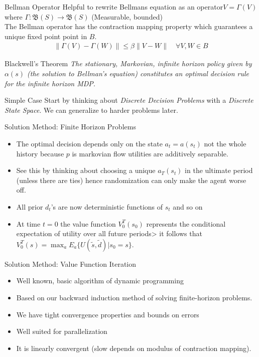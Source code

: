 \documentclass[xcolor=pdftex,dvipsnames,table,mathserif]{beamer}
\begin{document}
\begin{frame}{Bellman Operator}
Helpful to rewrite Bellmans equation as an operator$V = \Gamma(V)$ where $\Gamma: \mathfrak{B}(S) \rightarrow \mathfrak{B}(S)$ (Measurable, bounded) \\
\vspace{0.5cm}
The Bellman operator has the contraction mapping property which guarantees a unique fixed point point in $B$.
\begin{eqnarray*}
\| \Gamma(V) - \Gamma(W) \| \leq \beta \| V-W \| \quad \forall V,W \in B
\end{eqnarray*}
\begin{block}{Blackwell's Theorem}
\textit{The stationary, Markovian, infinite horizon policy given by $\alpha(s)$ (the solution to Bellman's equation)  constitutes an optimal decision rule for the infinite horizon MDP.}
\end{block}
\end{frame}

\begin{frame}{Simple Case}
Start by thinking about \textit{Discrete Decision Problems} with a \textit{Discrete State Space}.  We can generalize to harder problems later.
\end{frame}

\begin{frame}{Solution Method: Finite Horizon Problems}
\begin{itemize}
\item The optimal decision depends only on the state $a_t = a(s_t)$ not the whole history because $p$ is markovian flow utilities are additively separable.
\item See this by thinking about choosing a unique $a_T(s_t)$ in the ultimate period (unless there are ties) hence randomization can only make the agent worse off.
\item All prior $d_t$'s are now deterministic functions of $s_t$ and so on
\item At time $t=0$ the value function $V_0^T(s_0)$ represents the conditional expectation of utility over all future periods> it follows that $V_0^T(s) = \max_{a} E_{a}\{ U(\tilde{s},\tilde{d}) | s_0 = s\}$.
\end{itemize}
\end{frame}

\begin{frame}{Solution Method: Value Function Iteration}
\begin{itemize}
\item Well known, basic algorithm of dynamic programming
\item Based on our backward induction method of solving finite-horizon problems.
\item We have tight convergence properties and bounds on errors
\item Well suited for parallelization
\item It is linearly convergent (slow depends on modulus of contraction mapping).
\end{itemize}
\end{frame}
\end{document}
